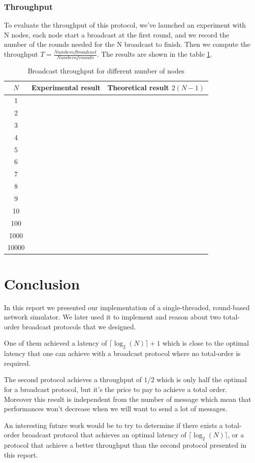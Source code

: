 \documentclass[a4paper]{article}
\begin{document}
 \subsubsection*{Throughput}
To evaluate the throughput of this protocol, we've launched an experiment with N
nodes, each node start a broadcast at the first round, and we record the number
of the rounds needed for the N broadcast to finish. Then we compute the
throughput $T=\frac{Number of broadcast}{Number of rounds}$. The results are
shown in the table \ref{table:thT}.
\begin{table}[H]
\centering
\begin{tabular}{|c|c|c|}
    \hline
    $N$  & Experimental result & Theoretical result $2(N-1)$ \\
    \hline
    1     &   &   \\
    2     &   &   \\
    3     &   &   \\
    4     &   &   \\
    5     &   &   \\
    6     &   &   \\
    7     &   &   \\
    8     &   &   \\
    9     &   &   \\
    10    &   &   \\
    100   &   &   \\
    1000  &   &   \\
    10000 &   &   \\
    \hline
\end{tabular}
\caption{Broadcast throughput for different number of nodes}
\label{table:thT}
\end{table}

\section*{Conclusion}
In this report we presented our implementation of a single-threaded,
round-based network simulator. We later used it to implement and reason about
two total-order broadcast protocols that we designed.

One of them achieved a latency of $\lceil\log_2(N)\rceil + 1$ which is close
to the optimal latency that one can achieve with a broadcast protocol where no
total-order is required.

The second protocol achieves a throughput of $1/2$ which is only half the
optimal for a broadcast protocol, but it's the price to pay to achieve a total
order. Moreover this result is independent from the number of message which mean
that performances won't decrease when we will want to send a lot of messages.

An interesting future work would be to try to determine if there exists a
total-order broadcast protocol that achieves an optimal latency of
$\lceil\log_2(N)\rceil$, or a protocol that achieve a better throughput than
the second protocol presented in this report.
\end{document}
